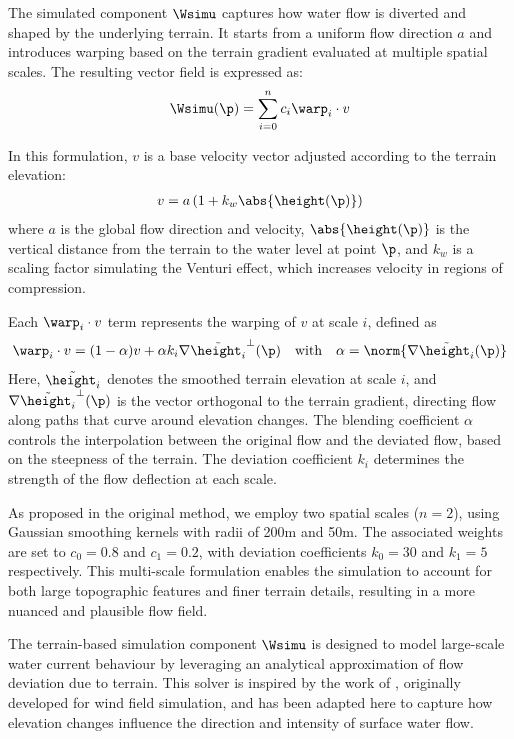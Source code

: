 The simulated component $\Wsimu$ captures how water flow is diverted and shaped by the underlying terrain. It starts from a uniform flow direction $a$ and introduces warping based on the terrain gradient evaluated at multiple spatial scales. The resulting vector field is expressed as:
\begin{align}
    \Wsimu(\p) = \sum_{i=0}^{n}{c_i \warp_i \cdot v}
\end{align}

In this formulation, $v$ is a base velocity vector adjusted according to the terrain elevation:
\begin{align}
    v = a \left(1 + k_w \abs{\height(\p)} \right)
\end{align}
where $a$ is the global flow direction and velocity, $\abs{\height(\p)}$ is the vertical distance from the terrain to the water level at point $\p$, and $k_w$ is a scaling factor simulating the Venturi effect, which increases velocity in regions of compression.

Each $\warp_i \cdot v$ term represents the warping of $v$ at scale $i$, defined as
\begin{align}
    \warp_i \cdot v = (1 - \alpha) v + \alpha k_i \nabla \Tilde{\height_i}^{\perp}(\p) \quad \text{with} \quad \alpha = \norm{ \nabla \Tilde{\height_i}(\p) }
\end{align}
Here, $\Tilde{\height_i}$ denotes the smoothed terrain elevation at scale $i$, and $\nabla \Tilde{\height_i}^{\perp}(\p)$ is the vector orthogonal to the terrain gradient, directing flow along paths that curve around elevation changes. The blending coefficient $\alpha$ controls the interpolation between the original flow and the deviated flow, based on the steepness of the terrain. The deviation coefficient $k_i$ determines the strength of the flow deflection at each scale.

As proposed in the original method, we employ two spatial scales ($n = 2$), using Gaussian smoothing kernels with radii of 200m and 50m. The associated weights are set to $c_0 = 0.8$ and $c_1 = 0.2$, with deviation coefficients $k_0 = 30$ and $k_1 = 5$ respectively. This multi-scale formulation enables the simulation to account for both large topographic features and finer terrain details, resulting in a more nuanced and plausible flow field.

The terrain-based simulation component $\Wsimu$ is designed to model large-scale water current behaviour by leveraging an analytical approximation of flow deviation due to terrain. This solver is inspired by the work of \cite{Paris2019b}, originally developed for wind field simulation, and has been adapted here to capture how elevation changes influence the direction and intensity of surface water flow.

